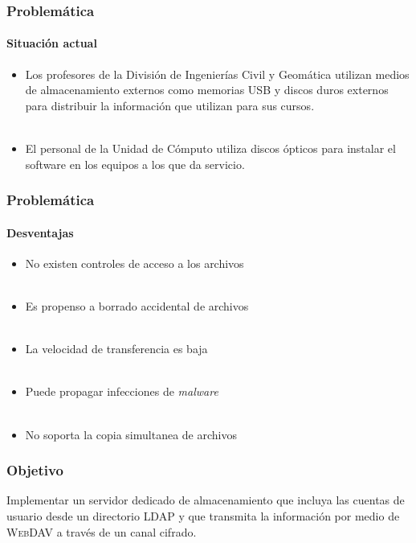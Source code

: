 \documentclass{beamer}
\begin{document}
\begin{frame}
\frametitle{Problem\'{a}tica}
\framesubtitle{Situaci\'{o}n actual}

\begin{itemize}
\justifying
  \item Los profesores de la Divisi\'{o}n de Ingenier\'{i}as Civil y Geom\'{a}tica utilizan medios de almacenamiento externos como memorias USB y discos duros externos para distribuir la informaci\'{o}n que utilizan para sus cursos.
\\~\\
  \item El personal de la Unidad de C\'{o}mputo utiliza discos \'{o}pticos para instalar el software en los equipos a los que da servicio.
\end{itemize}

 {
  
 }

\end{frame}
\begin{frame}
\frametitle{Problem\'{a}tica}
\framesubtitle{Desventajas}
\justifying

\begin{itemize}
\justifying
  \item No existen controles de acceso a los archivos
\\~\\
  \item Es propenso a borrado accidental de archivos
\\~\\
  \item La velocidad de transferencia es baja
\\~\\
  \item Puede propagar infecciones de \textit{malware}
\\~\\
  \item No soporta la copia simultanea de archivos
\end{itemize}

\end{frame}
\begin{frame}

\frametitle{Objetivo}
\justifying

Implementar un servidor dedicado de almacenamiento que incluya las cuentas de usuario desde un directorio \textsc{LDAP} y que transmita la informaci\'{o}n por medio de \textsc{WebDAV} a trav\'{e}s de un canal cifrado.

 {
  
 }

\end{frame}
\end{document}
